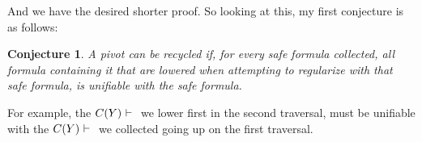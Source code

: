\documentclass[12pt]{article}
\newtheorem{conj}{Conjecture}
\theoremstyle{definition}
\theoremstyle{remark}
\begin{document}
And we have the desired shorter proof. So looking at this, my first conjecture is as follows:

\begin{conj}
\label{conj: recycle-cond}
A pivot can be recycled if, for every safe formula collected, all formula containing it that are lowered when attempting to regularize with that safe formula, is unifiable with the safe formula.
\end{conj}

For example, the $C(Y)\mbox{\ $\vdash$\ }$ we lower first in the second traversal, must be unifiable with the $C(Y)\mbox{\ $\vdash$\ }$ we collected going up on the first traversal.
\end{document}
